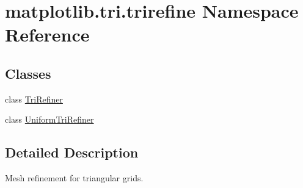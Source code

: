 \hypertarget{namespacematplotlib_1_1tri_1_1trirefine}{}\section{matplotlib.\+tri.\+trirefine Namespace Reference}
\label{namespacematplotlib_1_1tri_1_1trirefine}
\subsection*{Classes}
\begin{DoxyCompactItemize}
\item 
class \hyperlink{classmatplotlib_1_1tri_1_1trirefine_1_1TriRefiner}{Tri\+Refiner}
\item 
class \hyperlink{classmatplotlib_1_1tri_1_1trirefine_1_1UniformTriRefiner}{Uniform\+Tri\+Refiner}
\end{DoxyCompactItemize}


\subsection{Detailed Description}
\begin{DoxyVerb}Mesh refinement for triangular grids.
\end{DoxyVerb}
 